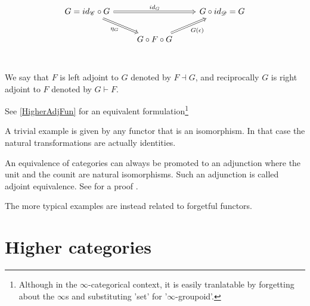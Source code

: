 \begin{defn}[Adjunction]
\[\begin{tikzcd}
    \end{tikzcd}\]
    \[\begin{tikzcd}
        {G= id_\cat\circ G} && {G\circ id_\dat= G} \\
        & {G\circ F\circ G} \\
        \arrow["{\eta_{G}}"', Rightarrow, from=1-1, to=2-2]
        \arrow["{G(\epsilon)}"', Rightarrow, from=2-2, to=1-3]
        \arrow["{id_{G}}", Rightarrow, from=1-1, to=1-3]
    \end{tikzcd}\]
    We say that $F$ is left adjoint to $G$ denoted by $F\dashv G$, and reciprocally $G$ is right adjoint to $F$ denoted by $G\vdash F$.
    
    See \ref{HigherAdjFun} for an equivalent formulation\footnote{Although in the $\infty$-categorical 
    context, it is easily tranlatable by forgetting about the $\infty$s and substituting 'set' for
    '$\infty$-groupoid'.}
\end{defn}

\begin{ex}
    A trivial example is given by any functor that is an isomorphism. In that case the natural transformations are actually identities. 

    \noindent An equivalence of categories can always be promoted to an adjunction where the 
    unit and the counit are natural isomorphisms. Such an adjunction is called adjoint equivalence.
    See for a proof \cite[4.4.5]{riehl2017category}.

    \noindent The more typical examples are instead related to forgetful functors.
\end{ex}


\section{Higher categories \extra}
\label{sub:higher_categories}


